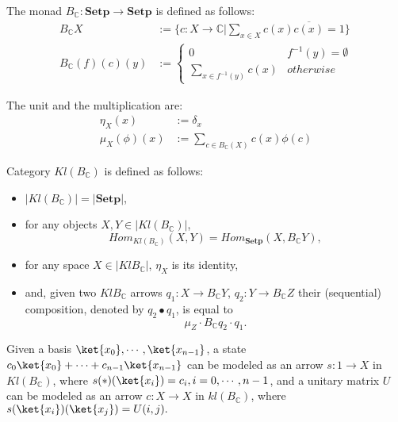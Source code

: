 \documentclass{llncs}
\newcommand{\C}{\mathbb{C}}
\newcommand{\BC}{B_{\mathbb{C}}}
\begin{document}
\begin{definition}
The monad $\BC:\mathbf{Setp}\rightarrow \mathbf{Setp}$ is defined as follows:
$$
\begin{aligned}
\BC X&:=\{c:X\rightarrow \C|\sum_{x\in X}c(x)\overline{c(x)}=1\}\\
\BC(f)(c)(y)&:=\begin{cases}0 &f^{-1}(y)=\emptyset\\
\sum_{x\in f^{-1}(y)}c(x) &otherwise
\end{cases}
\end{aligned}
$$

\end{definition}
The unit and the multiplication are:
$$
\begin{aligned}
\eta_{X}(x)&:=\delta_{x}\\
\mu_{X}(\phi)(x)&:=\sum_{c\in B_{\C}(X)}c(x)\phi(c)
\end{aligned}
$$

\begin{definition}
Category $Kl(\BC)$ is defined as follows:
\begin{itemize}
\item $|Kl(\BC)|=|\mathbf{Setp}|$,
\item for any objects $X,Y\in |Kl(B_{\C})|$,
$$Hom_{Kl(B_{\C})}(X,Y)=Hom_{\mathbf{Setp}}(X,\BC Y),$$
\item for any space $X\in |Kl\BC|$, $\eta_X$ is its identity,
\item and, given two $Kl\BC$ arrows $q_1:X\rightarrow \BC Y$, $q_2:Y\rightarrow \BC Z$ their (sequential) composition, denoted by $q_2\bullet q_1$, is equal to $$\mu_Z\cdot \BC q_2\cdot q_1.$$
\end{itemize}
\end{definition}

Given a basis $\ket{x_0},\cdots,\ket{x_{n-1}}$, a state $c_0\ket{x_0}+\cdots+c_{n-1}\ket{x_{n-1}}$ can be modeled as an arrow
$s:1\rightarrow X$ in $Kl(\BC)$, where $s(\ast)({\ket{x_i}})=c_i, i=0,\cdots,n-1$, and a unitary matrix $U$ can be modeled as an arrow $c:X\rightarrow X$ in $kl(\BC)$, where $s(\ket{x_i})(\ket{x_j})=U(i,j).$ 
\begin{example}

\end{example}





\end{document}
